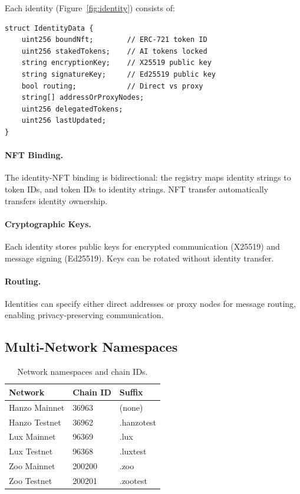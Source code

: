 \documentclass[11pt,twocolumn]{article}
\begin{document}
Each identity (Figure~\ref{fig:identity}) consists of:

\begin{lstlisting}[language=Solidity]
struct IdentityData {
    uint256 boundNft;        // ERC-721 token ID
    uint256 stakedTokens;    // AI tokens locked
    string encryptionKey;    // X25519 public key
    string signatureKey;     // Ed25519 public key
    bool routing;            // Direct vs proxy
    string[] addressOrProxyNodes;
    uint256 delegatedTokens;
    uint256 lastUpdated;
}
\end{lstlisting}

\paragraph{NFT Binding.} The identity-NFT binding is bidirectional: the registry maps identity strings to token IDs, and token IDs to identity strings. NFT transfer automatically transfers identity ownership.

\paragraph{Cryptographic Keys.} Each identity stores public keys for encrypted communication (X25519) and message signing (Ed25519). Keys can be rotated without identity transfer.

\paragraph{Routing.} Identities can specify either direct addresses or proxy nodes for message routing, enabling privacy-preserving communication.

\subsection{Multi-Network Namespaces}

\begin{table}[h]
\centering
\caption{Network namespaces and chain IDs.}
\label{tab:namespaces}
\begin{tabular}{lll}
\toprule
\textbf{Network} & \textbf{Chain ID} & \textbf{Suffix} \\
\midrule
Hanzo Mainnet & 36963 & (none) \\
Hanzo Testnet & 36962 & .hanzotest \\
Lux Mainnet & 96369 & .lux \\
Lux Testnet & 96368 & .luxtest \\
Zoo Mainnet & 200200 & .zoo \\
Zoo Testnet & 200201 & .zootest \\
\bottomrule
\end{tabular}
\end{table}
\end{document}
